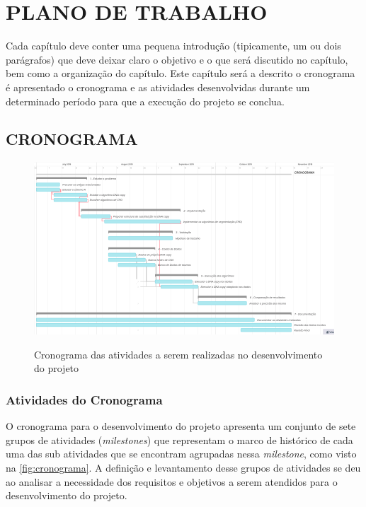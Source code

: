 
\chapter{PLANO DE TRABALHO}
\label{chap:planoDeTrabalho}

Cada capítulo deve conter uma pequena introdução (tipicamente, um ou dois parágrafos) que deve deixar claro o objetivo e o que será discutido no capítulo, bem como a organização do capítulo.
Este capítulo será a descrito o cronograma 
 é apresentado o cronograma e as atividades desenvolvidas durante um determinado período para que a execução do projeto se conclua.

\section{CRONOGRAMA}

\begin{figure}[!htb]
    \centering
    \caption{Cronograma das atividades a serem realizadas no desenvolvimento do projeto}
    \includegraphics[width=1\textwidth]{./dados/figuras/cronograma}
    \label{fig:cronograma}
\end{figure}

\subsection{Atividades do Cronograma}

O cronograma para o desenvolvimento do projeto apresenta um conjunto de sete grupos de atividades (\textit{milestones}) que representam o marco de histórico de cada uma das sub atividades que se encontram agrupadas nessa \textit{milestone}, como visto na \autoref{fig:cronograma}. A definição e levantamento desse grupos de atividades se deu ao analisar a necessidade dos requisitos e objetivos a serem atendidos para o desenvolvimento do projeto.

